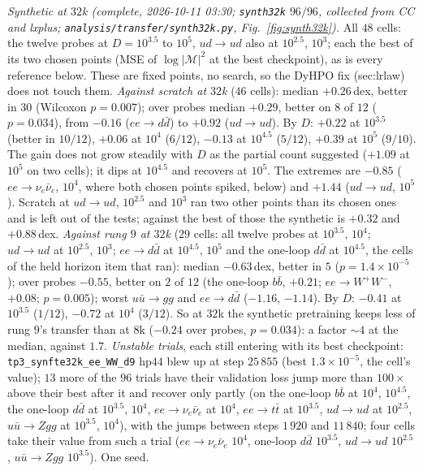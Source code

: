 \documentclass[11pt]{article}
\newcommand{\code}[1]{\texttt{#1}}
\begin{document}
\emph{Synthetic at $32$k (complete, 2026-10-11 03:30; \code{synth32k} $96/96$, collected from CC and lxplus;
\code{analysis/transfer/synth32k.py}, Fig.~\ref{fig:synth32k}).} All $48$ cells: the twelve probes at $D=10^{3.5}$ to
$10^5$, $u d\to u d$ also at $10^{2.5}$, $10^3$; each the best of its two chosen points (MSE of $\log|\mathcal M|^2$ at the
best checkpoint), as is every reference below. These are fixed points, no search, so the DyHPO fix (sec:lrlaw) does not
touch them. \emph{Against scratch at $32$k} ($46$ cells): median $+0.26$\,dex, better in $30$ (Wilcoxon $p=0.007$); over
probes median $+0.29$, better on $8$ of $12$ ($p=0.034$), from $-0.16$ ($ee\to d\bar d$) to $+0.92$ ($ud\to ud$). By $D$:
$+0.22$ at $10^{3.5}$ (better in $10/12$), $+0.06$ at $10^4$ ($6/12$), $-0.13$ at $10^{4.5}$ ($5/12$), $+0.39$ at $10^5$
($9/10$). The gain does not grow steadily with $D$ as the partial count suggested ($+1.09$ at $10^5$ on two cells); it
dips at $10^{4.5}$ and recovers at $10^5$. The extremes are $-0.85$ ($ee\to\nu_e\bar\nu_e$, $10^4$, where both chosen
points spiked, below) and $+1.44$ ($ud\to ud$, $10^5$). Scratch at $ud\to ud$, $10^{2.5}$ and $10^3$ ran two other points
than its chosen ones and is left out of the tests; against the best of those the synthetic is $+0.32$ and $+0.88$\,dex.
\emph{Against rung $9$ at $32$k} ($29$ cells: all twelve probes at $10^{3.5}$, $10^4$; $ud\to ud$ at $10^{2.5}$, $10^3$;
$ee\to d\bar d$ at $10^{4.5}$, $10^5$ and the one-loop $d\bar d$ at $10^{4.5}$, the cells of the held horizon item that ran):
median $-0.63$\,dex, better in $5$ ($p=1.4\times10^{-5}$); over probes $-0.55$, better on $2$ of $12$ (the one-loop $b\bar b$,
$+0.21$; $ee\to W^+W^-$, $+0.08$; $p=0.005$); worst $u\bar u\to gg$ and $ee\to d\bar d$ ($-1.16$, $-1.14$). By $D$: $-0.41$
at $10^{3.5}$ ($1/12$), $-0.72$ at $10^4$ ($3/12$). So at $32$k the synthetic pretraining keeps less of rung $9$'s
transfer than at $8$k ($-0.24$ over probes, $p=0.034$): a factor $\sim\!4$ at the median, against $1.7$.
\emph{Unstable trials}, each still entering with its best checkpoint: \code{tp3\_synfte32k\_ee\_WW\_d9} hp$44$ blew up at
step $25\,855$ (best $1.3\times10^{-5}$, the cell's value); $13$ more of the $96$ trials have their validation loss jump
more than $100\times$ above their best after it and recover only partly (on the one-loop $b\bar b$ at $10^4$, $10^{4.5}$,
the one-loop $d\bar d$ at $10^{3.5}$, $10^4$, $ee\to\nu_e\bar\nu_e$ at $10^4$, $ee\to t\bar t$ at $10^{3.5}$, $ud\to ud$ at
$10^{2.5}$, $u\bar u\to Zgg$ at $10^{3.5}$, $10^4$), with the jumps between steps $1\,920$ and $11\,840$; four cells take
their value from such a trial ($ee\to\nu_e\bar\nu_e$ $10^4$, one-loop $d\bar d$ $10^{3.5}$, $ud\to ud$ $10^{2.5}$,
$u\bar u\to Zgg$ $10^{3.5}$). One seed.
\end{document}
